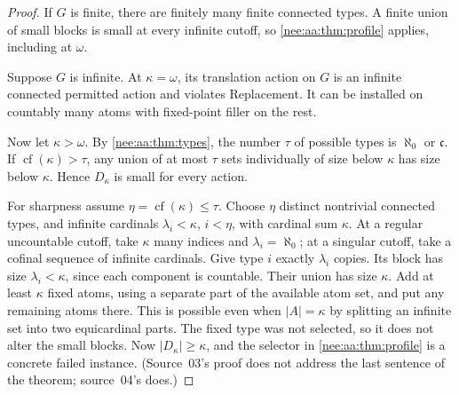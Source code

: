 \documentclass[11pt,letterpaper]{article}
\numberwithin{equation}{section}
\theoremstyle{plain}
\theoremstyle{definition}
\theoremstyle{remark}
\newcommand{\cf}{\operatorname{cf}}
\newcommand{\cont}{\mathfrak c}
\begin{document}
\begin{proof}
If $G$ is finite, there are finitely many finite connected types. A finite
union of small blocks is small at every infinite cutoff, so
\cref{nee:aa:thm:profile} applies, including at $\omega$.

Suppose $G$ is infinite. At $\kappa=\omega$, its translation action on $G$
is an infinite connected permitted action and violates Replacement. It can
be installed on countably many atoms with fixed-point filler on the rest.

Now let $\kappa>\omega$. By \cref{nee:aa:thm:types}, the number $\tau$ of possible
types is $\aleph_0$ or $\cont$. If $\cf(\kappa)>\tau$, any union of at most
$\tau$ sets individually of size below $\kappa$ has size below $\kappa$.
Hence $D_\kappa$ is small for every action.

For sharpness assume $\eta=\cf(\kappa)\leq\tau$. Choose $\eta$ distinct
nontrivial connected types, and infinite cardinals $\lambda_i<\kappa$,
$i<\eta$, with cardinal sum $\kappa$. At a regular uncountable cutoff,
take $\kappa$ many indices and $\lambda_i=\aleph_0$; at a singular cutoff,
take a cofinal sequence of infinite cardinals. Give type $i$ exactly
$\lambda_i$ copies. Its block has size $\lambda_i<\kappa$, since each
component is countable. Their union has size $\kappa$. Add at least $\kappa$
fixed atoms, using a separate part of the available atom set, and put any
remaining atoms there. This is possible even when $|A|=\kappa$ by splitting
an infinite set into two equicardinal parts. The fixed type was not selected,
so it does not alter the small blocks. Now $|D_\kappa|\geq\kappa$, and the
selector in \cref{nee:aa:thm:profile} is a concrete failed instance.
(Source~03's proof does not address the last sentence of the theorem; source~04's does.)
\end{proof}
\end{document}

